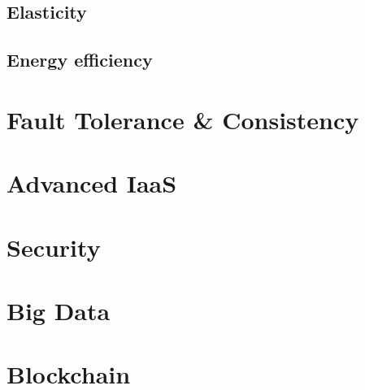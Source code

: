 \section{Elasticity}

\section{Energy efficiency}

\chapter{Fault Tolerance \& Consistency}

\chapter{Advanced IaaS}

\chapter{Security}

\chapter{Big Data}

\chapter{Blockchain}
